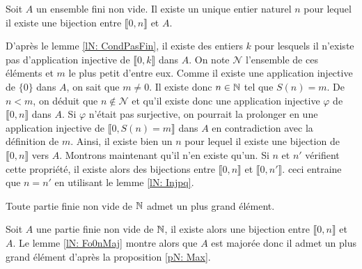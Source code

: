 \begin{prop}[\ref{pN: DefCard}]
 Soit $A$ un ensemble fini non vide. Il existe un unique entier naturel $n$ pour lequel il existe une bijection entre $\llbracket 0, n\rrbracket$ et $A$.
\end{prop}
\begin{demo}
 D'après le lemme \ref{lN: CondPasFin}, il existe des entiers $k$ pour lesquels il n'existe pas d'application injective de $\llbracket 0,k \rrbracket$ dans $A$. On note $\mathcal N$ l'ensemble de ces éléments et $m$ le plus petit d'entre eux.\newline
Comme il existe une application injective de $\{0\}$ dans $A$, on sait que $m\neq 0$. Il existe donc $n\in\mathbb{N}$ tel que $S(n)=m$.\newline
De $n<m$, on déduit que $n\notin \mathcal{N}$ et qu'il existe donc une application injective $\varphi$ de $\llbracket 0,n \rrbracket$ dans $A$. Si $\varphi$ n'était pas surjective, on pourrait la prolonger en une application injective de $\llbracket 0,S(n)=m \rrbracket$ dans $A$ en contradiction avec la définition de $m$.\newline
Ainsi, il existe bien un $n$ pour lequel il existe une bijection de $\llbracket 0,n \rrbracket$ vers $A$.\newline
Montrons maintenant qu'il n'en existe qu'un.\newline 
Si $n$ et $n'$ vérifient cette propriété, il existe alors des bijections entre $\llbracket 0,n \rrbracket$ et $\llbracket 0,n' \rrbracket$. ceci entraine que $n=n'$ en utilisant le lemme \ref{lN: Injpq}. 
\end{demo}

\begin{prop}[\ref{pN: FiniMax}]
Toute partie finie non vide de $\mathbb{N}$ admet un plus grand élément. 
\end{prop}
\begin{demo}
 Soit $A$ une partie finie non vide de $\mathbb{N}$, il existe alors une bijection entre $\llbracket 0,n \rrbracket$ et $A$. Le lemme \ref{lN: Fo0nMaj} montre alors que $A$ est majorée donc il admet un plus grand élément d'après la proposition \ref{pN: Max}.
\end{demo}

